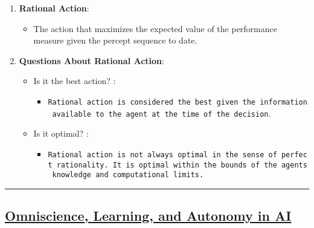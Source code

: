 \documentclass[
]{article}
\begin{document}
\begin{enumerate}
\def\labelenumi{\arabic{enumi}.}
\item
  \textbf{Rational Action}:

  \begin{itemize}
  \item
    The action that maximizes the expected value of the performance
    measure given the percept sequence to date.
  \end{itemize}
\item
  \textbf{Questions About Rational Action}:

  \begin{itemize}
  \item
    Is it the best action? :

    \begin{itemize}
    \item
      \texttt{Rational\ action\ is\ considered\ the\ best\ given\ the\ information\ available\ to\ the\ agent\ at\ the\ time\ of\ the\ decision}.
    \end{itemize}
  \item
    Is it optimal? :

    \begin{itemize}
    \item
      \texttt{Rational\ action\ is\ not\ always\ optimal\ in\ the\ sense\ of\ perfect\ rationality.\ It\ is\ optimal\ within\ the\ bounds\ of\ the\ agent\textquotesingle{}s\ knowledge\ and\ computational\ limits.}
    \end{itemize}
  \end{itemize}
\end{enumerate}

\begin{center}\rule{0.5\linewidth}{0.5pt}\end{center}

\subsection{\texorpdfstring{\ul{Omniscience, Learning, and Autonomy in
AI}}{Omniscience, Learning, and Autonomy in AI}}\label{omniscience-learning-and-autonomy-in-ai}
\end{document}
